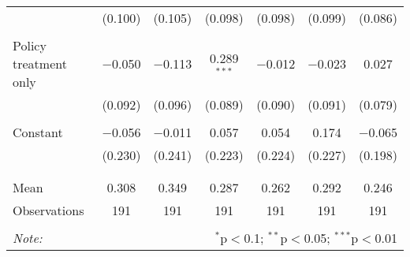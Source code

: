 \begin{tabular}{@{\extracolsep{5pt}}lcccccc}
  & (0.100) & (0.105) & (0.098) & (0.098) & (0.099) & (0.086) \\ 
  & & & & & & \\ 
 Policy treatment only & $-$0.050 & $-$0.113 & 0.289$^{***}$ & $-$0.012 & $-$0.023 & 0.027 \\ 
  & (0.092) & (0.096) & (0.089) & (0.090) & (0.091) & (0.079) \\ 
  & & & & & & \\ 
 Constant & $-$0.056 & $-$0.011 & 0.057 & 0.054 & 0.174 & $-$0.065 \\ 
  & (0.230) & (0.241) & (0.223) & (0.224) & (0.227) & (0.198) \\ 
  & & & & & & \\ 
\hline \\[-1.8ex] 
Mean & 0.308 & 0.349 & 0.287 & 0.262 & 0.292 & 0.246 \\ 
Observations & 191 & 191 & 191 & 191 & 191 & 191 \\ 
\hline 
\hline \\[-1.8ex] 
\textit{Note:}  & \multicolumn{6}{r}{$^{*}$p$<$0.1; $^{**}$p$<$0.05; $^{***}$p$<$0.01} \\ 
\end{tabular} 
